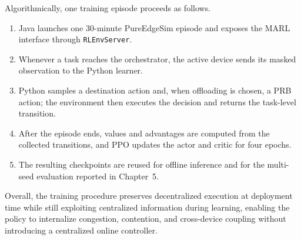 Algorithmically, one training episode proceeds as follows.
\begin{enumerate}
    \item Java launches one 30-minute PureEdgeSim episode and exposes the MARL interface through \texttt{RLEnvServer}.
    \item Whenever a task reaches the orchestrator, the active device sends its masked observation to the Python learner.
    \item Python samples a destination action and, when offloading is chosen, a PRB action; the environment then executes the decision and returns the task-level transition.
    \item After the episode ends, values and advantages are computed from the collected transitions, and PPO updates the actor and critic for four epochs.
    \item The resulting checkpoints are reused for offline inference and for the multi-seed evaluation reported in Chapter~5.
\end{enumerate}

Overall, the training procedure preserves decentralized execution at deployment time while still exploiting centralized information during learning, enabling the policy to internalize congestion, contention, and cross-device coupling without introducing a centralized online controller.
